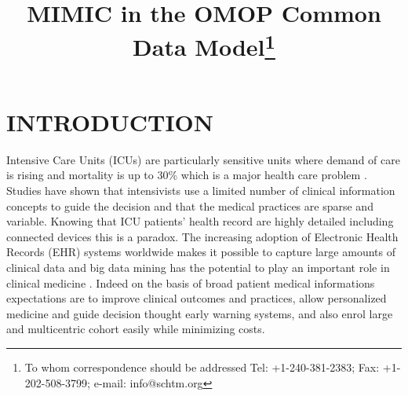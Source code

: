 \documentclass{aes2e}
\begin{document}


\title{MIMIC in the OMOP Common Data Model\thanks{To whom correspondence should be addressed Tel: +1-240-381-2383; Fax: +1-202-508-3799; e-mail: info@schtm.org}}




\maketitle

\section{INTRODUCTION}

Intensive Care Units (ICUs) are particularly sensitive units  where demand of
care is rising\cite{angus2000} and mortality is up to 30\% which is a major
health care problem \cite{icu-mortality}. Studies have shown that intensivists
use a limited number of clinical information concepts to guide the
decision\cite{icu-evidence} and that the medical practices are sparse and
variable. Knowing that ICU patients' health record are highly detailed
including connected devices this is a paradox.
The increasing adoption of Electronic Health Records (EHR) systems worldwide
makes it possible to capture large amounts of clinical data
\cite{bigdata-promise} and big data mining has the potential to play an
important role in clinical medicine \cite{bigdata-mining}. Indeed on the basis
of broad patient medical informations expectations are to improve clinical
outcomes and practices, allow personalized medicine and guide decision thought
early warning systems, and also enrol large and multicentric cohort easily
while minimizing costs.
\end{document}
